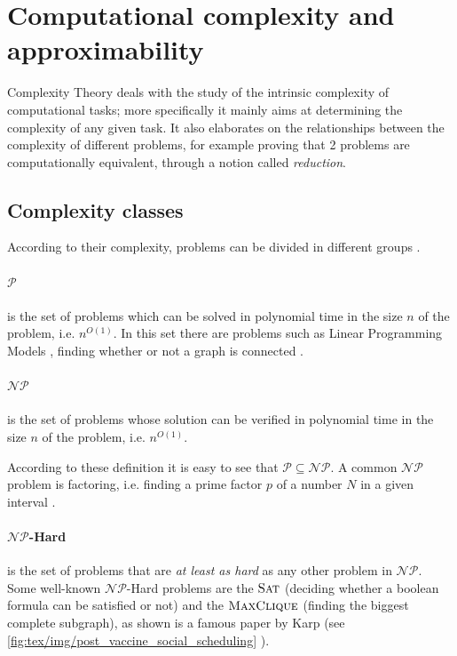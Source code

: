 \section{Computational complexity and \\approximability}%
\label{sec:computational_complexity_and_approximability}

Complexity Theory deals with the study of the intrinsic complexity of
computational tasks; more specifically it mainly aims at determining the
complexity of any given task. It also elaborates on the relationships between
the complexity of different problems, for example proving that 2 problems are
computationally equivalent\cite{9780521884730}, through a notion called
\emph{reduction}.

\subsection{Complexity classes}%
\label{par:complexity_classes}

According to their complexity, problems can be divided in different groups
\cite{DemaineFall2014}.

\paragraph{$\mathcal{P} $}%
\label{par:p}
is the set of problems which can be solved in polynomial time in the size $n$ of
the problem, i.e. $n^{O(1)} $. In this set there are problems such as Linear
Programming Models \cite{KHACHIYAN198053}\cite{Karmarkar1984}, finding whether
or not a graph is connected \cite{9780521884730}.

\paragraph{$\mathcal{NP} $}%
\label{par:np} is the set of problems whose solution can be verified in
polynomial time in the size $n$ of the problem, i.e. $n^{O(1)} $.

According to these definition it is easy to see that $\mathcal{P} \subseteq
	\mathcal{NP} $. A common $\mathcal{NP} $ problem is factoring, i.e. finding a
prime factor $p$ of a number $N$ in a given interval \cite{SanjeevArora2017}.

\paragraph{$\mathcal{NP} $-Hard}%
\label{par:_np_hard} is the set of problems that are \emph{at least as hard} as
any other problem in $\mathcal{NP} $. Some well-known $\mathcal{NP} $-Hard
problems are the $\textsc{Sat}$ (deciding whether a boolean formula can be
satisfied or not) and the $\textsc{MaxClique}$ (finding the biggest complete
subgraph), as shown is a famous paper by Karp \cite{Miller1972} (see
\autoref{fig:tex/img/post_vaccine_social_scheduling} ).

